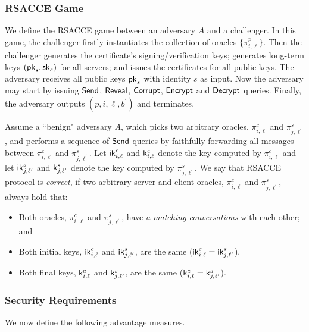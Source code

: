 \subsubsection{RSACCE Game}
We define the RSACCE game between an adversary $A$ and
a challenger.
In this game, the challenger firstly instantiates the
collection of oracles $\{\pi^p_{i,\ell}\}$.
Then the challenger generates the certificate's
signing/verification keys; generates long-term keys
$(\mathsf{pk}_s, \mathsf{sk}_s)$ for all servers; and issues the
certificates for all public keys.
The adversary receives all public keys $\mathsf{pk}_s$ with
identity $s$ as input.
Now the adversary may start by issuing $\mathsf{Send}$,
$\mathsf{Reveal}$, $\mathsf{Corrupt}$, $\mathsf{Encrypt}$ and $\mathsf{Decrypt}$ queries.
Finally, the adversary outputs
$(p, i, \ell, b^{\prime})$ and terminates.

\begin{definition}[Correctness]
 Assume a ``benign" adversary $A$, which picks two
 arbitrary oracles, $\pi^c_{i, \ell}$ and
 $\pi^s_{j, \ell^{\prime}}$, and performs a sequence of
 $\mathsf{Send}$-queries by faithfully forwarding all messages
 between $\pi^c_{i, \ell}$ and $\pi^s_{j, \ell^{\prime}}$.
 Let $\mathsf{ik}^c_{i, \ell}$ and $\mathsf{k}^c_{i, \ell}$ denote the
 key computed by $\pi^c_{i, \ell}$ and let
 $\mathsf{ik}^s_{j, \ell^{\prime}}$ and $\mathsf{k}^s_{j, \ell^{\prime}}$
 denote the key computed by $\pi^s_{j, \ell^{\prime}}$.
 We say that RSACCE protocol is \textit{correct}, if two
 arbitrary server and client oracles, $\pi^c_{i, \ell}$
 and $\pi^s_{j, \ell^{\prime}}$, always hold that:
 \begin{itemize}
  \item{Both oracles, $\pi^c_{i, \ell}$ and
  $\pi^s_{j, \ell^{\prime}}$, have
  \textit{a matching conversations} with each other; and}

  \item{Both initial keys, $\mathsf{ik}^c_{i, \ell}$ and
  $\mathsf{ik}^s_{j, \ell^{\prime}}$, are the same
  ($\mathsf{ik}^c_{i, \ell} = \mathsf{ik}^s_{j, \ell^{\prime}}$).}

  \item{Both final keys, $\mathsf{k}^c_{i, \ell}$ and
  $\mathsf{k}^s_{j, \ell^{\prime}}$, are the same
  ($\mathsf{k}^c_{i, \ell} = \mathsf{k}^s_{j, \ell^{\prime}}$).}
 \end{itemize}
\end{definition}

\subsubsection{Security Requirements}
We now define the following advantage measures.

